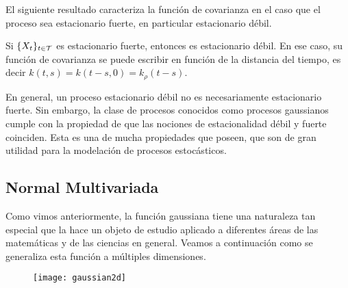 El siguiente resultado caracteriza la función de covarianza en el caso que el proceso sea estacionario fuerte, en particular estacionario débil.
\begin{proposition}
	Si \(\{X_t\}_{t \in \mathcal{T}}\) es estacionario fuerte, entonces es estacionario débil. En ese caso, su función de covarianza se puede escribir en función de la distancia del tiempo, es decir \(k(t, s) = k(t - s, 0) = k_\rho( t - s)\).
\end{proposition}

En general, un proceso estacionario débil no es necesariamente estacionario fuerte. Sin embargo, la clase de procesos conocidos como procesos gaussianos cumple con la propiedad de que las nociones de estacionalidad débil y fuerte coinciden. Esta es una de mucha propiedades que poseen, que son de gran utilidad para la modelación de procesos estocásticos.

\subsection{Normal Multivariada}
Como vimos anteriormente, la función gaussiana tiene una naturaleza tan especial que la hace un objeto de estudio aplicado a diferentes áreas de las matemáticas y de las ciencias en general. Veamos a continuación como se generaliza esta función a múltiples dimensiones.

\begin{figure}[h]
	\centering
	\texttt{[image: gaussian2d]}
\end{figure}

